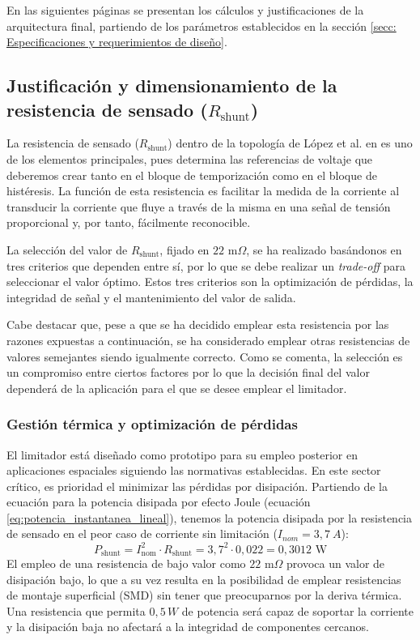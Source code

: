\documentclass[12pt]{report} %
\begin{document}
En las siguientes páginas se presentan los cálculos y justificaciones de la arquitectura final, partiendo de los parámetros establecidos en la sección \ref{secc: Especificaciones y requerimientos de diseño}. 

\subsection{Justificación y dimensionamiento de la resistencia de sensado ($R_\text{shunt}$)}
La resistencia de sensado ($R_\text{shunt}$) dentro de la topología de López et al. en \cite{lopez_antuna_diseno_2024} es uno de los elementos principales, pues determina las referencias de voltaje que deberemos crear tanto en el bloque de temporización como en el bloque de histéresis. La función de esta resistencia es facilitar la medida de la corriente al transducir la corriente que fluye a través de la misma en una señal de tensión proporcional y, por tanto, fácilmente reconocible. 

La selección del valor de $R_\text{shunt}$, fijado en $22\text{ m}\Omega$, se ha realizado basándonos en tres criterios que dependen entre sí, por lo que se debe realizar un \textit{trade-off} para seleccionar el valor óptimo. Estos tres criterios son la optimización de pérdidas, la integridad de señal y el mantenimiento del valor de salida.

Cabe destacar que, pese a que se ha decidido emplear esta resistencia por las razones expuestas a continuación, se ha considerado emplear otras resistencias de valores semejantes siendo igualmente correcto. Como se comenta, la selección es un compromiso entre ciertos factores por lo que la decisión final del valor dependerá de la aplicación para el que se desee emplear el limitador. 

\subsubsection{Gestión térmica y optimización de pérdidas}
El limitador está diseñado como prototipo para su empleo posterior en aplicaciones espaciales siguiendo las normativas establecidas. En este sector crítico, es prioridad el minimizar las pérdidas por disipación. Partiendo de la ecuación para la potencia disipada por efecto Joule (ecuación \ref{eq:potencia_instantanea_lineal}), tenemos la potencia disipada por la resistencia de sensado en el peor caso de corriente sin limitación ($I_{nom} =3{,}7~A$): 
\begin{equation}
    \label{PerdidasRshunt}
    P_\text{shunt} = I_\text{nom}^{2} \cdot R_\text{shunt} = 3{,}7^{2} \cdot 0{,}022= 0{,}3012\text{ W}
\end{equation}
El empleo de una resistencia de bajo valor como $22\text{ m}\Omega$ provoca un valor de disipación bajo, lo que a su vez resulta en la posibilidad de emplear resistencias de montaje superficial (SMD) sin tener que preocuparnos por la deriva térmica. Una resistencia que permita $0{,}5\,W$ de potencia será capaz de soportar la corriente y la disipación baja no afectará a la integridad de componentes cercanos. 
\end{document}

